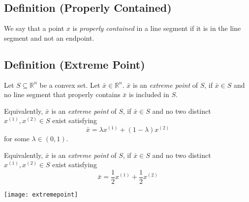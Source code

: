 \begin{defbox}
    \subsection{Definition (Properly Contained)}
    We say that a point $x$ is \emph{properly contained} in a line segment if it is in the line segment and not an endpoint.
\end{defbox}

\begin{defbox}
    \subsection{Definition (Extreme Point)}
    Let $ S\subseteq \mathbb{R}^n $ be a convex set.
    Let $ \bar{x}\in\mathbb{R}^n $.
    $ \bar{x} $ is an \emph{extreme point} of $ S $, if $ \bar{x}\in S $ and
    no line segment that properly contains $ \bar{x} $ is included
    in $ S $.

    Equivalently, $ \bar{x} $ is an \emph{extreme point} of $ S $, if 
    $ \bar{x}\in S $ and no two distinct $ x^{(1)},x^{(2)}\in S $ exist satisfying
    \[ \bar{x}=\lambda x^{(1)} + (1-\lambda)x^{(2)} \]
    for some $ \lambda\in (0,1) $.

    Equivalently, $ \bar{x} $ is an \emph{extreme point} of $ S $, if
    $ \bar{x}\in S $ and no two distinct $ x^{(1)},x^{(2)}\in S $ exist satisfying
    \[ \bar{x}=\frac{1}{2} x^{(1)} + \frac{1}{2} x^{(2)} \]
\end{defbox}

\begin{center}
    \texttt{[image: extremepoint]}
\end{center}